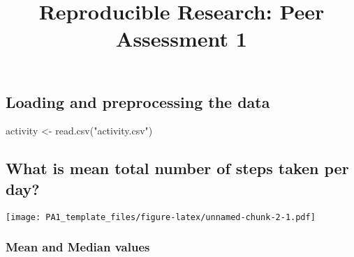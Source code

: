 \documentclass[
]{article}
\title{Reproducible Research: Peer Assessment 1}
\author{}
\date{\vspace{-2.5em}}
\newenvironment{Shaded}{\begin{snugshade}}{\end{snugshade}}
\newcommand{\AttributeTok}[1]{\textcolor[rgb]{0.77,0.63,0.00}{#1}}
\newcommand{\ConstantTok}[1]{\textcolor[rgb]{0.00,0.00,0.00}{#1}}
\newcommand{\FunctionTok}[1]{\textcolor[rgb]{0.00,0.00,0.00}{#1}}
\newcommand{\NormalTok}[1]{#1}
\newcommand{\OtherTok}[1]{\textcolor[rgb]{0.56,0.35,0.01}{#1}}
\newcommand{\SpecialCharTok}[1]{\textcolor[rgb]{0.00,0.00,0.00}{#1}}
\newcommand{\StringTok}[1]{\textcolor[rgb]{0.31,0.60,0.02}{#1}}
\begin{document}
\maketitle

\hypertarget{loading-and-preprocessing-the-data}{%
\subsection{Loading and preprocessing the
data}\label{loading-and-preprocessing-the-data}}

\begin{Shaded}
\begin{Highlighting}[]
\NormalTok{activity }\OtherTok{\textless{}{-}} \FunctionTok{read.csv}\NormalTok{(}\StringTok{"activity.csv"}\NormalTok{)}
\end{Highlighting}
\end{Shaded}

\hypertarget{what-is-mean-total-number-of-steps-taken-per-day}{%
\subsection{What is mean total number of steps taken per
day?}\label{what-is-mean-total-number-of-steps-taken-per-day}}

\begin{Shaded}
\end{Shaded}

\texttt{[image: PA1\_template\_files/figure-latex/unnamed-chunk-2-1.pdf]}

\hypertarget{mean-and-median-values}{%
\subsubsection{Mean and Median values}\label{mean-and-median-values}}
\end{document}
